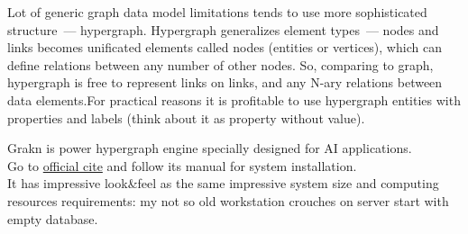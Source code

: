 \label{hyper}\secdown

Lot of generic graph data model limitations tends to use more sophisticated
structure\ --- hypergraph. Hypergraph generalizes element types\ --- nodes and
links becomes unificated elements called nodes (entities or vertices), which can
define relations between any number of other nodes. So, comparing to graph,
hypergraph is free to represent links on links, and any N-ary relations between
data elements.For practical reasons it is profitable to use hypergraph entities
with properties and labels (think about it as property without value).

\secdown




Grakn is power hypergraph engine specially designed for AI applications.\\
Go to \href{https://grakn.ai}{official cite} and follow its manual for system
installation.\\
It has impressive look\&feel as the same impressive system size and computing
resources requirements: my not so old workstation crouches on server start with
empty database.

\secup

\secup
